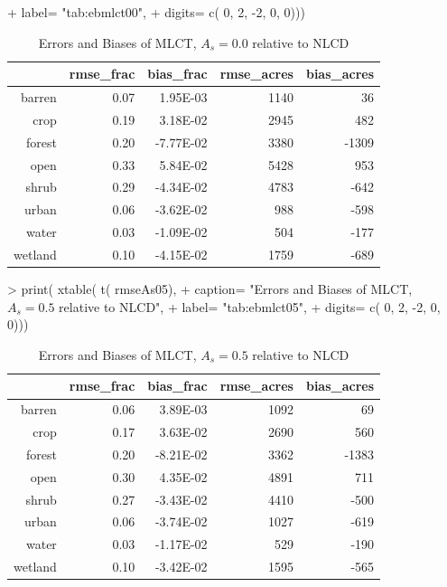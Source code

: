 \begin{Schunk}
\begin{Sinput}
+               label= "tab:ebmlct00",
+               digits= c( 0, 2, -2, 0, 0)))
\end{Sinput}
\begin{table}[ht]
\begin{center}
\begin{tabular}{rrrrr}
  \hline
 & rmse\_frac & bias\_frac & rmse\_acres & bias\_acres \\ 
  \hline
barren & 0.07 & 1.95E-03 & 1140 & 36 \\ 
  crop & 0.19 & 3.18E-02 & 2945 & 482 \\ 
  forest & 0.20 & -7.77E-02 & 3380 & -1309 \\ 
  open & 0.33 & 5.84E-02 & 5428 & 953 \\ 
  shrub & 0.29 & -4.34E-02 & 4783 & -642 \\ 
  urban & 0.06 & -3.62E-02 & 988 & -598 \\ 
  water & 0.03 & -1.09E-02 & 504 & -177 \\ 
  wetland & 0.10 & -4.15E-02 & 1759 & -689 \\ 
   \hline
\end{tabular}
\caption{Errors and Biases of MLCT, $A_s = 0.0$ relative to NLCD}
\label{tab:ebmlct00}
\end{center}
\end{table}\begin{Sinput}
> print( xtable( t( rmseAs05), 
+               caption= "Errors and Biases of MLCT, $A_s = 0.5$ relative to NLCD",
+               label= "tab:ebmlct05",
+               digits= c( 0, 2, -2, 0, 0)))
\end{Sinput}
\begin{table}[ht]
\begin{center}
\begin{tabular}{rrrrr}
  \hline
 & rmse\_frac & bias\_frac & rmse\_acres & bias\_acres \\ 
  \hline
barren & 0.06 & 3.89E-03 & 1092 & 69 \\ 
  crop & 0.17 & 3.63E-02 & 2690 & 560 \\ 
  forest & 0.20 & -8.21E-02 & 3362 & -1383 \\ 
  open & 0.30 & 4.35E-02 & 4891 & 711 \\ 
  shrub & 0.27 & -3.43E-02 & 4410 & -500 \\ 
  urban & 0.06 & -3.74E-02 & 1027 & -619 \\ 
  water & 0.03 & -1.17E-02 & 529 & -190 \\ 
  wetland & 0.10 & -3.42E-02 & 1595 & -565 \\ 
   \hline
\end{tabular}
\caption{Errors and Biases of MLCT, $A_s = 0.5$ relative to NLCD}
\label{tab:ebmlct05}
\end{center}
\end{table}\end{Schunk}

